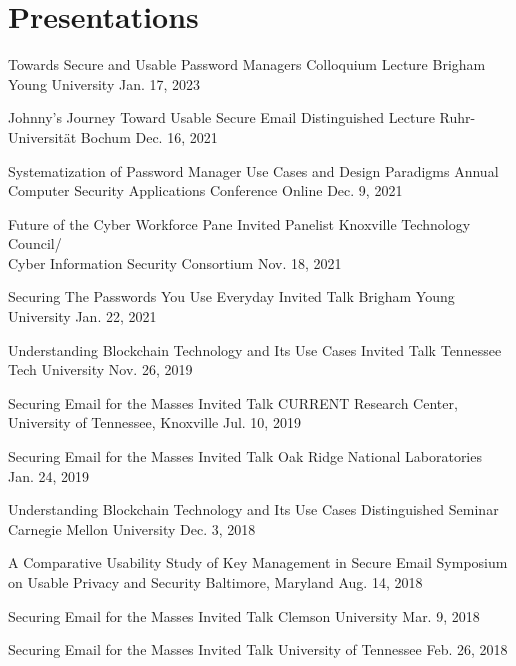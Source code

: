 
\section{Presentations}

\begin{presentations}
	
	\presentation
		{Towards Secure and Usable Password Managers}
		{Colloquium Lecture}
		{Brigham Young University}
		{Jan. 17, 2023}
	
	\presentation
		{Johnny's Journey Toward Usable Secure Email}
		{Distinguished Lecture}
		{Ruhr-Universit\"{a}t Bochum}
		{Dec. 16, 2021}
	
	\presentation
		{Systematization of Password Manager Use Cases and Design Paradigms}
		{ Annual Computer Security Applications Conference}
		{Online}
		{Dec. 9, 2021}
	
	\presentation
		{Future of the Cyber Workforce Pane}
		{Invited Panelist}
		{Knoxville Technology Council/\\Cyber Information Security Consortium}
		{Nov. 18, 2021}
	
	\presentation
		{Securing The Passwords You Use Everyday}
		{Invited Talk}
		{Brigham Young University}
		{Jan. 22, 2021}
	
	\presentation
		{Understanding Blockchain Technology and Its Use Cases}
		{Invited Talk}
		{Tennessee Tech University}
		{Nov. 26, 2019}
	
	\presentation
		{Securing Email for the Masses}
		{Invited Talk}
		{CURRENT Research Center, University of Tennessee, Knoxville}
		{Jul. 10, 2019}
	
	\presentation
		{Securing Email for the Masses}
		{Invited Talk}
		{Oak Ridge National Laboratories}
		{Jan. 24, 2019}
	
	\presentation
		{Understanding Blockchain Technology and Its Use Cases}
		{Distinguished Seminar}
		{Carnegie Mellon University}
		{Dec. 3, 2018}
		
	\presentation
		{A Comparative Usability Study of Key Management in Secure Email}
		{ Symposium on Usable Privacy and Security}
		{Baltimore, Maryland}
		{Aug. 14, 2018}
	
	\presentation
		{Securing Email for the Masses}
		{Invited Talk}
		{Clemson University}
		{Mar. 9, 2018}
	
	\presentation
		{Securing Email for the Masses}
		{Invited Talk}
		{University of Tennessee}
		{Feb. 26, 2018}
		

\end{presentations}

